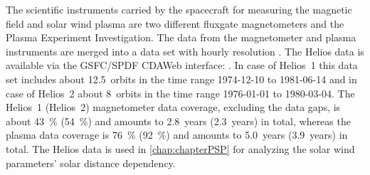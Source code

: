 The scientific instruments carried by the spacecraft for measuring the magnetic field and solar wind plasma are two different fluxgate magnetometers and the Plasma Experiment Investigation. The data from the magnetometer and plasma instruments are merged into a data set with hourly resolution \citep{Rosenbauer1977}. The Helios data is available via the GSFC/SPDF CDAWeb interface: . In case of Helios~1 this data set includes about 12.5~orbits in the time range \mbox{1974-12-10} to \mbox{1981-06-14} and in case of Helios~2 about 8~orbits in the time range \mbox{1976-01-01} to \mbox{1980-03-04}. The Helios~1 (Helios~2) magnetometer data coverage, excluding the data gaps, is about \SI{43}{\%} (\SI{54}{\%}) and amounts to 2.8~years (2.3~years) in total, whereas the plasma data coverage is \SI{76}{\%} (\SI{92}{\%}) and amounts to 5.0~years (3.9~years) in total.
The Helios data is used in \autoref{chap:chapterPSP} for analyzing the solar wind parameters' solar distance dependency.








